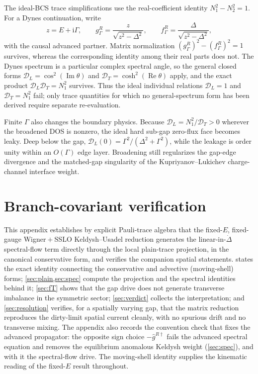 \documentclass[
  aps,
  prb,
  preprint,
  superscriptaddress,
  longbibliography,
  nofootinbib
]{revtex4-2}
\newcommand{\ii}{\mathrm{i}}
\newcommand{\DOS}{N_1}
\newcommand{\hatg}{\hat{g}}
\newcommand{\Real}{\operatorname{Re}}
\newcommand{\Imag}{\operatorname{Im}}
\begin{document}
The ideal-BCS trace simplifications use the real-coefficient identity
\(\DOS^2-N_2^2=1\). For a Dynes continuation, write
\[
z=E+\ii\Gamma,\qquad
g_\Gamma^R=\frac{z}{\sqrt{z^2-\Delta^2}},\qquad
f_\Gamma^R=\frac{\Delta}{\sqrt{z^2-\Delta^2}},
\]
with the causal advanced partner. Matrix normalization
\((g_\Gamma^R)^2-(f_\Gamma^R)^2=1\) survives, whereas the corresponding
identity among their real parts does not. The Dynes spectrum is a particular
complex spectral angle, so the general closed forms
\(\mathcal D_L=\cos^2(\Imag\theta)\) and
\(\mathcal D_T=\cosh^2(\Real\theta)\) apply, and the exact product
\(\mathcal D_L\mathcal D_T=\DOS^2\) survives. Thus the ideal individual
relations \(\mathcal D_L=1\) and \(\mathcal D_T=\DOS^2\) fail; only trace
quantities for which no general-spectrum form has been derived require
separate re-evaluation.

Finite \(\Gamma\) also changes the boundary physics. Because
\(\mathcal D_L=\DOS^2/\mathcal D_T>0\) wherever the broadened DOS is nonzero,
the ideal hard sub-gap zero-flux face becomes leaky. Deep below the gap,
\(\mathcal D_L(0)=\Gamma^2/(\Delta^2+\Gamma^2)\), while the leakage is order
unity within an \(O(\Gamma)\) edge layer. Broadening still regularizes the
gap-edge divergence and the matched-gap singularity of the
Kupriyanov--Lukichev charge-channel interface weight.

\section{Branch-covariant verification}\label{app:branch}


This appendix establishes by explicit Pauli-trace algebra that the
fixed-$E$, fixed-gauge Wigner${}+{}$SSLO Keldysh--Usadel reduction generates
the linear-in-$\dot\Delta$ spectral-flow term directly through the local
plain-trace projection, in the canonical conservative form, and verifies
the companion spatial statements.  states the exact
identity connecting the conservative and advective (moving-shell) forms;
\cref{sec:plain,sec:spec} compute the projection and the spectral
identities behind it; \cref{sec:fT} shows that the gap drive does not
generate transverse imbalance in the symmetric sector;
\cref{sec:verdict} collects the interpretation; and
\cref{sec:resolution} verifies, for a spatially varying gap, that the matrix
reduction reproduces the dirty-limit spatial current cleanly, with no spurious
drift and no transverse mixing. The appendix also records the convention
check that fixes the advanced propagator: the opposite sign choice
$-\hatg^{R\dagger}$ fails the advanced spectral equation and removes the
equilibrium anomalous Keldysh weight (\cref{sec:spec}), and with it the
spectral-flow drive. The moving-shell identity supplies the kinematic
reading of the fixed-$E$ result throughout.
\end{document}
